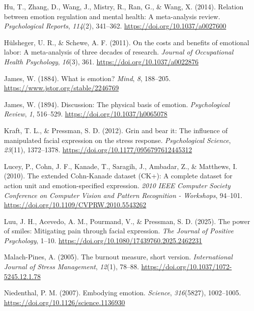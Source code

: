 \documentclass[
  letterpaper,
  DIV=11,
  numbers=noendperiod]{scrartcl}
\newlength{\cslhangindent}
\newenvironment{CSLReferences}[2] %
 {\begin{list}{}{%
  \setlength{\itemindent}{0pt}
  \setlength{\leftmargin}{0pt}
  \setlength{\parsep}{0pt}
  \ifodd #1
   \setlength{\leftmargin}{\cslhangindent}
   \setlength{\itemindent}{-1\cslhangindent}
  \fi
  \setlength{\itemsep}{#2\baselineskip}}}
 {\end{list}}
\begin{document}
\begin{CSLReferences}{1}{0}
Hu, T., Zhang, D., Wang, J., Mistry, R., Ran, G., \& Wang, X. (2014).
Relation between emotion regulation and mental health: A meta-analysis
review. \emph{Psychological Reports}, \emph{114}(2), 341--362.
\url{https://doi.org/10.1037/a0027600}

Hülsheger, U. R., \& Schewe, A. F. (2011). On the costs and benefits of
emotional labor: A meta-analysis of three decades of research.
\emph{Journal of Occupational Health Psychology}, \emph{16}(3), 361.
\url{https://doi.org/10.1037/a0022876}

James, W. (1884). What is emotion? \emph{Mind}, \emph{8}, 188--205.
\url{https://www.jstor.org/stable/2246769}

James, W. (1894). Discussion: The physical basis of emotion.
\emph{Psychological Review}, \emph{1}, 516--529.
\url{https://doi.org/10.1037/h0065078}

Kraft, T. L., \& Pressman, S. D. (2012). Grin and bear it: The influence
of manipulated facial expression on the stress response.
\emph{Psychological Science}, \emph{23}(11), 1372--1378.
\url{https://doi.org/10.1177/0956797612445312}

Lucey, P., Cohn, J. F., Kanade, T., Saragih, J., Ambadar, Z., \&
Matthews, I. (2010). The extended {Cohn-Kanade} dataset ({CK+}): A
complete dataset for action unit and emotion-specified expression.
\emph{2010 IEEE Computer Society Conference on Computer Vision and
Pattern Recognition - Workshops}, 94--101.
\url{https://doi.org/10.1109/CVPRW.2010.5543262}

Luu, J. H., Acevedo, A. M., Pourmand, V., \& Pressman, S. D. (2025). The
power of smiles: Mitigating pain through facial expression. \emph{The
Journal of Positive Psychology}, 1--10.
\url{https://doi.org/10.1080/17439760.2025.2462231}

Malach-Pines, A. (2005). The burnout measure, short version.
\emph{International Journal of Stress Management}, \emph{12}(1), 78--88.
\url{https://doi.org/10.1037/1072-5245.12.1.78}

Niedenthal, P. M. (2007). Embodying emotion. \emph{Science},
\emph{316}(5827), 1002--1005.
\url{https://doi.org/10.1126/science.1136930}


\end{CSLReferences}
\end{document}
